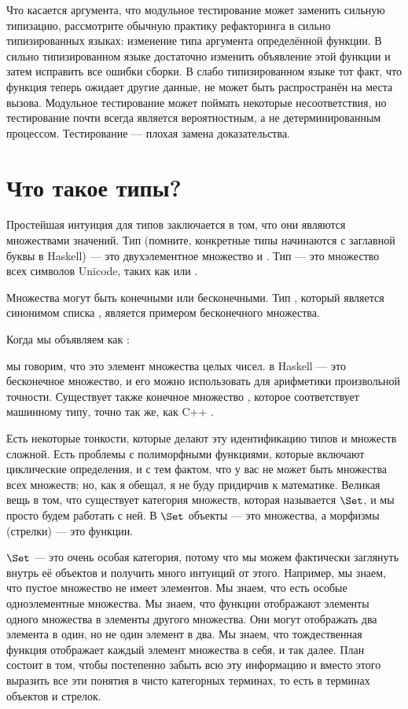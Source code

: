 Что касается аргумента, что модульное тестирование может заменить сильную типизацию,
рассмотрите обычную практику рефакторинга в сильно типизированных языках:
изменение типа аргумента определённой функции. В сильно
типизированном языке достаточно изменить объявление этой функции
и затем исправить все ошибки сборки. В слабо типизированном языке тот факт,
что функция теперь ожидает другие данные, не может быть распространён на места
вызова. Модульное тестирование может поймать некоторые несоответствия, но тестирование
почти всегда является вероятностным, а не детерминированным процессом.
Тестирование --- плохая замена доказательства.

\section{Что такое типы?}

Простейшая интуиция для типов заключается в том, что они являются множествами значений.
Тип  (помните, конкретные типы начинаются с заглавной буквы
в Haskell) --- это двухэлементное множество  и .
Тип  --- это множество всех символов Unicode, таких как
 или .

Множества могут быть конечными или бесконечными. Тип , который является
синонимом списка , является примером бесконечного множества.

Когда мы объявляем  как :

мы говорим, что это элемент множества целых чисел.
 в Haskell --- это бесконечное множество, и его можно использовать для
арифметики произвольной точности. Существует также конечное множество ,
которое соответствует машинному типу, точно так же, как C++ .

Есть некоторые тонкости, которые делают эту идентификацию типов и
множеств сложной. Есть проблемы с полиморфными функциями, которые включают
циклические определения, и с тем фактом, что у вас не может быть множества всех
множеств; но, как я обещал, я не буду придирчив к математике. Великая вещь
в том, что существует категория множеств, которая называется $\Set$, и
мы просто будем работать с ней. В $\Set$ объекты --- это множества, а морфизмы
(стрелки) --- это функции.

$\Set$ --- это очень особая категория, потому что мы можем фактически заглянуть
внутрь её объектов и получить много интуиций от этого. Например,
мы знаем, что пустое множество не имеет элементов. Мы знаем, что есть
особые одноэлементные множества. Мы знаем, что функции отображают элементы одного
множества в элементы другого множества. Они могут отображать два элемента в один, но
не один элемент в два. Мы знаем, что тождественная функция отображает каждый
элемент множества в себя, и так далее. План состоит в том, чтобы постепенно забыть
всю эту информацию и вместо этого выразить все эти понятия в чисто
категорных терминах, то есть в терминах объектов и стрелок.

